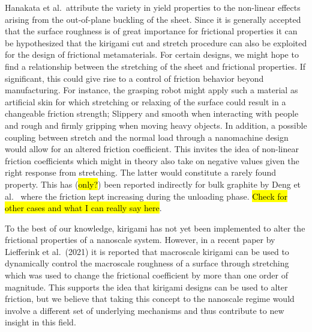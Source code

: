 Hanakata et al.\ attribute the variety in yield properties to the non-linear
effects arising from the out-of-plane buckling of the sheet. Since it is
generally accepted that the surface roughness is of great importance for
frictional properties it can be hypothesized that the kirigami cut and stretch
procedure can also be exploited for the design of frictional metamaterials. For
certain designs, we might hope to find a relationship between the stretching of the
sheet and frictional properties. If significant, this could give rise to a control of friction behavior beyond manufacturing. For
instance, the grasping robot might apply such a material as artificial skin for
which stretching or relaxing of the surface could result in a changeable
friction strength; Slippery and smooth when interacting with people and rough and
firmly gripping when moving heavy objects. In addition, a possible coupling
between stretch and the normal load through a nanomachine design would allow for
an altered friction coefficient. This invites the idea of non-linear friction
coefficients which might in theory also take on negative values given the right
response from stretching. The latter would constitute a rarely found
property. This has (\hl{only?}) been reported indirectly for bulk graphite by Deng
et al.\ \cite{deng_adhesion-dependent_2012} where the friction kept increasing
during the unloading phase. \hl{Check for other cases and what I can really say
here}.

To the best of our knowledge, kirigami has not yet been implemented to alter the
frictional properties of a nanoscale system. However, in a recent paper by Liefferink et
al.\ \cite{LIEFFERINK2021101475}(2021) it is reported that macroscale kirigami
can be used to dynamically control the macroscale roughness of a surface through
stretching which was used to change the frictional coefficient by more than one
order of magnitude. This supports the idea that kirigami designs can be
used to alter friction, but we believe that taking this concept to the nanoscale regime would involve a different set of underlying mechanisms and thus
contribute to new insight in this field.






